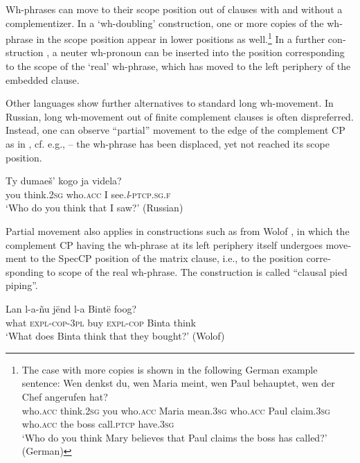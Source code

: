 \documentclass[output=paper,colorlinks,citecolor=brown]{langscibook}
\begin{document}
\begin{otherlanguage}{english}
\noindent Wh-phrases can move to their scope position out of clauses with  and without  a complementizer. In a ‘wh-doubling' construction, one or more copies of the wh-phrase in the scope position appear in lower positions   as well.\footnote{The case with more copies is shown in the following German example sentence:
\ea 
\gll  Wen denkst du, wen Maria meint, wen Paul behauptet, wen der Chef angerufen hat?  \\
    who.\textsc{acc} think.\textsc{2sg} you who.\textsc{acc} Maria mean.\textsc{3sg} who.\textsc{acc} Paul claim.\textsc{3sg} who.\textsc{acc} the boss call.\textsc{ptcp} have.\textsc{3sg} \\
    \glt    ‘Who do you think Mary believes that Paul claims the boss has called?' \hfill (German)\label{ex:fanselow:1fn}
    \z
}  In a further construction , a neuter wh-pronoun can be inserted into the position corresponding to the scope of the ‘real' wh-phrase, which has moved to the left periphery of the embedded clause.

Other languages show further alternatives to standard long wh-movement. In Russian, long wh-movement out of finite complement clauses is often dispreferred. Instead, one can observe “partial” movement to the edge of the complement CP as in , cf. e.g., \citet{Gelderen2001} -- the wh-phrase has been displaced, yet not reached its scope position.

\ea 
\gll  Ty	dumaeš’	kogo	ja		videla?  \\
    you think.\textsc{2sg} who.\textsc{acc} I see.\textit{l}-\textsc{ptcp}.\textsc{sg}.\textsc{f}  \\
    \glt    ‘Who do you think that I saw?' \hfill (Russian)
    \label{ex:fanselow:2}
    \z

\noindent Partial movement also applies in constructions such as  from Wolof \citep{Torrence2013}, in which the complement CP having the wh-phrase at its left periphery itself undergoes movement to the SpecCP position of the matrix clause, i.e., to the position corresponding to scope of the real wh-phrase. The construction is called “clausal pied piping”.

\ea 
\gll  Lan		l-a-ñu	jënd	l-a		Bintë	foog?  \\
    what \textsc{expl}-\textsc{cop}-\textsc{3pl} buy \textsc{expl}-\textsc{cop} Binta think  \\
    \glt    ‘What does Binta think that they bought?' \hfill (Wolof)
    \label{ex:fanselow:3}
    \z


\end{otherlanguage}
\end{document}
